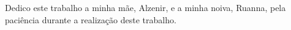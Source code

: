 \vspace*{15cm}

\hfill Dedico este trabalho a minha mãe, Alzenir, e a minha noiva, Ruanna, pela paciência durante a realização deste trabalho.\\